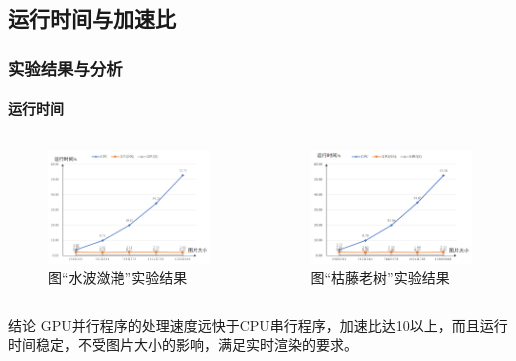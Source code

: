 \documentclass[aspectratio=43, xcolor=svgnames, t, 10pt]{beamer}
\begin{document}
\subsection{运行时间与加速比}
\begin{frame}
  \frametitle{实验结果与分析}
  \framesubtitle{运行时间}
  \begin{columns}
    \begin{column}{0.5\linewidth}
      \begin{figure}
        \includegraphics[width=1\linewidth]{./figure/runtime_figure1.png}
        \caption{图“水波潋滟”实验结果}
      \end{figure}
    \end{column}
    \begin{column}{0.5\linewidth}
      \begin{figure}
        \includegraphics[width=1\linewidth]{./figure/runtime_figure2.png}
        \caption{图“枯藤老树”实验结果}
      \end{figure}
    \end{column}
  \end{columns}
    \begin{block}{结论}
      \textrm{GPU}并行程序的处理速度远快于\textrm{CPU}串行程序，加速比达10以上，而且运行时间稳定，不受图片大小的影响，满足实时渲染的要求。
    \end{block}
\end{frame}
\end{document}
